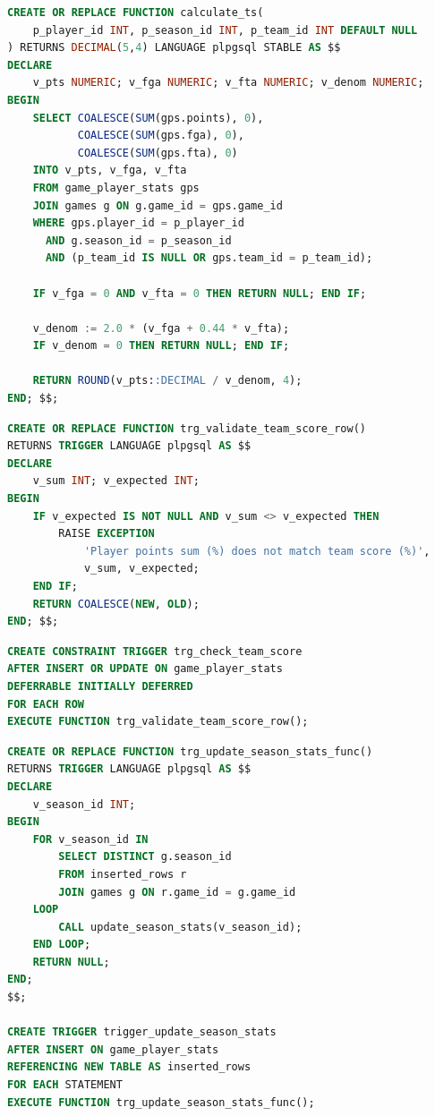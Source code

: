 \begin{lstlisting}[language=SQL, label=lst:ts,
  caption=Реализация функции \texttt{calculate\_ts} (фрагмент)]
CREATE OR REPLACE FUNCTION calculate_ts(
    p_player_id INT, p_season_id INT, p_team_id INT DEFAULT NULL
) RETURNS DECIMAL(5,4) LANGUAGE plpgsql STABLE AS $$
DECLARE
    v_pts NUMERIC; v_fga NUMERIC; v_fta NUMERIC; v_denom NUMERIC;
BEGIN
    SELECT COALESCE(SUM(gps.points), 0),
           COALESCE(SUM(gps.fga), 0),
           COALESCE(SUM(gps.fta), 0)
    INTO v_pts, v_fga, v_fta
    FROM game_player_stats gps
    JOIN games g ON g.game_id = gps.game_id
    WHERE gps.player_id = p_player_id
      AND g.season_id = p_season_id
      AND (p_team_id IS NULL OR gps.team_id = p_team_id);

    IF v_fga = 0 AND v_fta = 0 THEN RETURN NULL; END IF;

    v_denom := 2.0 * (v_fga + 0.44 * v_fta);
    IF v_denom = 0 THEN RETURN NULL; END IF;

    RETURN ROUND(v_pts::DECIMAL / v_denom, 4);
END; $$;
\end{lstlisting}

\begin{lstlisting}[language=SQL, label=lst:trigger,
  caption=Триггер проверки корректности очков (фрагмент)]
CREATE OR REPLACE FUNCTION trg_validate_team_score_row()
RETURNS TRIGGER LANGUAGE plpgsql AS $$
DECLARE
    v_sum INT; v_expected INT;
BEGIN
    IF v_expected IS NOT NULL AND v_sum <> v_expected THEN
        RAISE EXCEPTION
            'Player points sum (%) does not match team score (%)',
            v_sum, v_expected;
    END IF;
    RETURN COALESCE(NEW, OLD);
END; $$;
\end{lstlisting}

\begin{lstlisting}[language=SQL, label=lst:trigger-ddl,
  caption=Отложенный триггер проверки корректности очков]
CREATE CONSTRAINT TRIGGER trg_check_team_score
AFTER INSERT OR UPDATE ON game_player_stats
DEFERRABLE INITIALLY DEFERRED
FOR EACH ROW
EXECUTE FUNCTION trg_validate_team_score_row();
\end{lstlisting}

\begin{lstlisting}[language=SQL, label=lst:season-stats-trigger,
  caption=Триггер пересчёта витрины с переходной таблицей]
CREATE OR REPLACE FUNCTION trg_update_season_stats_func()
RETURNS TRIGGER LANGUAGE plpgsql AS $$
DECLARE
    v_season_id INT;
BEGIN
    FOR v_season_id IN
        SELECT DISTINCT g.season_id
        FROM inserted_rows r
        JOIN games g ON r.game_id = g.game_id
    LOOP
        CALL update_season_stats(v_season_id);
    END LOOP;
    RETURN NULL;
END;
$$;

CREATE TRIGGER trigger_update_season_stats
AFTER INSERT ON game_player_stats
REFERENCING NEW TABLE AS inserted_rows
FOR EACH STATEMENT
EXECUTE FUNCTION trg_update_season_stats_func();
\end{lstlisting}

